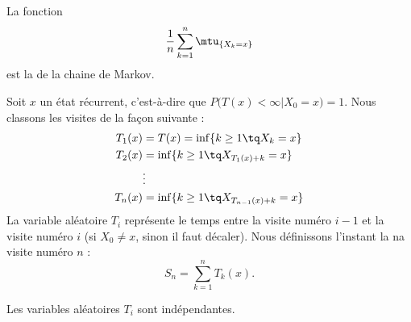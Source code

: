 La fonction
\begin{equation}
	\frac{1}{ n }\sum_{k=1}^n\mtu_{\{ X_k=x \}}
\end{equation}
est la  de la chaine de Markov.

Soit \( x\) un état récurrent, c'est-à-dire que \( P\big( T(x)<\infty|X_0=x \big)=1\). Nous classons les visites de la façon suivante :
\begin{subequations}    \label{SubEqsDefTirectempsretou}
	\begin{align}
		T_1(x) & =T(x)=\inf\{ k\geq 1\tq X_k=x \}         \\
		T_2(x) & =\inf\{ k\geq 1\tq X_{T_1(x)+k}=x \}     \\
		       & \vdots                                   \\
		T_n(x) & =\inf\{ k\geq 1\tq X_{T_{n-1}(x)+k}=x \}
	\end{align}
\end{subequations}
La variable aléatoire \( T_i\) représente le temps entre la visite numéro \( i-1\) et la visite numéro \( i\) (si \( X_0\neq x\), sinon il faut décaler). Nous définissons l'instant la na visite numéro \( n\) :
\begin{equation}
	S_n=\sum_{k=1}^nT_k(x).
\end{equation}

\begin{lemma}
	Les variables aléatoires \( T_i\) sont indépendantes.
\end{lemma}

